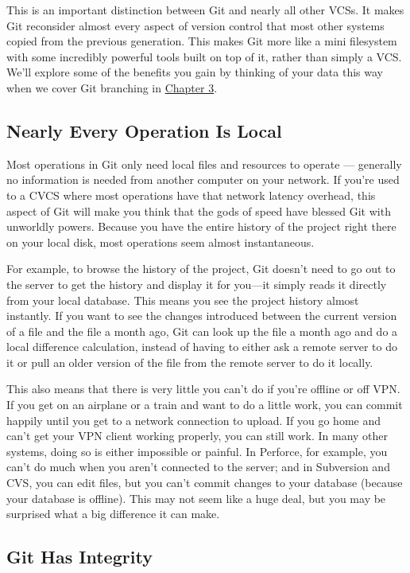 \documentclass[a4paper]{book}
\newcounter{tab}[chapter]
\newcommand{\prechap}{Chapter }
\newcommand{\postchap}{}
\newcommand{\chapref}[1]{\hyperref[chap:#1]{\prechap #1\postchap}}
\begin{document}
This is an important distinction between Git and nearly all other VCSs. It makes Git reconsider almost every aspect of version control that most other systems copied from the previous generation. This makes Git more like a mini filesystem with some incredibly powerful tools built on top of it, rather than simply a VCS. We'll explore some of the benefits you gain by thinking of your data this way when we cover Git branching in \chapref{3}.

\subsection{Nearly Every Operation Is Local}

Most operations in Git only need local files and resources to operate --- generally no information is needed from another computer on your network. If you're used to a CVCS where most operations have that network latency overhead, this aspect of Git will make you think that the gods of speed have blessed Git with unworldly powers. Because you have the entire history of the project right there on your local disk, most operations seem almost instantaneous.

For example, to browse the history of the project, Git doesn't need to go out to the server to get the history and display it for you---it simply reads it directly from your local database. This means you see the project history almost instantly. If you want to see the changes introduced between the current version of a file and the file a month ago, Git can look up the file a month ago and do a local difference calculation, instead of having to either ask a remote server to do it or pull an older version of the file from the remote server to do it locally.

This also means that there is very little you can't do if you're offline or off VPN. If you get on an airplane or a train and want to do a little work, you can commit happily until you get to a network connection to upload. If you go home and can't get your VPN client working properly, you can still work. In many other systems, doing so is either impossible or painful. In Perforce, for example, you can't do much when you aren't connected to the server; and in Subversion and CVS, you can edit files, but you can't commit changes to your database (because your database is offline). This may not seem like a huge deal, but you may be surprised what a big difference it can make.

\subsection{Git Has Integrity}
\end{document}
